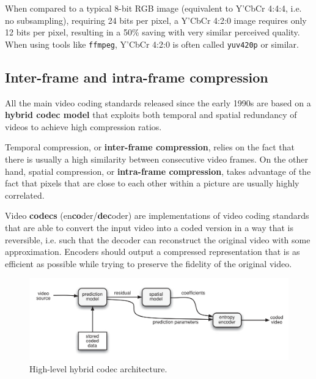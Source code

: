 When compared to a typical 8-bit RGB image (equivalent to Y'CbCr 4:4:4, i.e. no subsampling), requiring 24 bits per pixel, a Y'CbCr 4:2:0 image requires only 12 bits per pixel, resulting in a 50\% saving with very similar perceived quality. When using tools like \texttt{ffmpeg}, Y'CbCr 4:2:0 is often called \texttt{yuv420p} or similar.

\subsection{Inter-frame and intra-frame compression}
\label{sec:bg/compression/intra-inter}

All the main video coding standards released since the early 1990s are based on a \textbf{hybrid codec model} that exploits both temporal and spatial redundancy of videos to achieve high compression ratios.

Temporal compression, or \textbf{inter-frame compression}, relies on the fact that there is usually a high similarity between consecutive video frames. On the other hand, spatial compression, or \textbf{intra-frame compression}, takes advantage of the fact that pixels that are close to each other within a picture are usually highly correlated.

Video \textbf{codecs} (en\textbf{co}der/\textbf{dec}oder) are implementations of video coding standards that are able to convert the input video into a coded version in a way that is reversible, i.e. such that the decoder can reconstruct the original video with some approximation. Encoders should output a compressed representation that is as efficient as possible while trying to preserve the fidelity of the original video.

\begin{figure}[h]
	\centering
	
	\includegraphics[width=\textwidth]{res/hybrid_codec_high_level.png}
	
	\caption{High-level hybrid codec architecture.\cite{h264}}
	\label{fig:codec_highlevel}
\end{figure}

